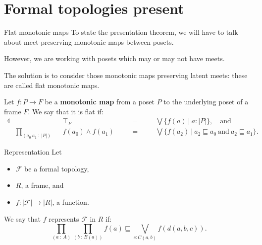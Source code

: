 \documentclass[xcolor={dvipsnames}]{beamer}
\newcommand{\pity}[3]{\prod_{(#1~:~#2)} #3}
\newcommand{\abs}[1]{\left| #1 \right|}
\newcommand{\McF}{\mathcal{F}}
\begin{document}
\section{Formal topologies present}

\begin{frame}{Flat monotonic maps}
  To state the presentation theorem, we will have to talk about meet-preserving monotonic
  maps between posets.

  \vspace{0.5em}

  However, we are working with posets which may or may not have meets.

  \vspace{0.5em}

  The solution is to consider those monotonic maps preserving \alert{latent meets}: these
  are called \alert{flat monotonic maps}.

  \vspace{0.5em}

  Let $f : P \rightarrow F$ be a \textbf{monotonic map} from a poset $P$ to the underlying poset of
  a frame $F$. We say that it is \alert{flat} if:
  \begin{alignat*}{4}
    & &&\top_F &&\quad=\quad &&\bigvee \{ f(a) ~|~ a : \abs{P} \},\quad\text{and}\\
    &\pity{a_0~a_1}{\abs{P}}{&&f(a_0) \wedge f(a_1) &&\quad=\quad &&\bigvee \{ f(a_2) ~|~ a_2 \sqsubseteq a_0 ~\text{and}~ a_2 \sqsubseteq a_1 \} }.
  \end{alignat*}
\end{frame}

\begin{frame}{Representation}
  Let
  \begin{itemize}
    \item $\McF{}$ be a formal topology,
    \item $R$, a frame, and
    \item $f : \abs{\McF{}} \rightarrow \abs{R}$, a function.
  \end{itemize}
  

  \vspace{1em}

  We say that $f$ \alert{represents} $\McF{}$ in $R$ if:
  \begin{equation*}
    \pity{a}{A}{\pity{b}{B(a)}{f(a) \sqsubseteq \bigvee_{c : C(a, b)} f(d(a, b, c))}}.
  \end{equation*}
\end{frame}
\end{document}

